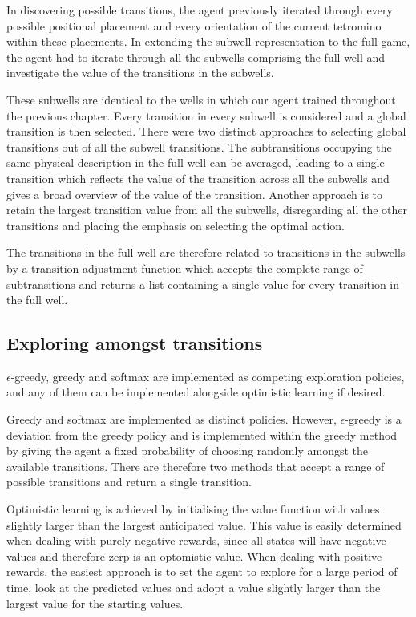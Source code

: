 \documentclass{rucsthesis}
\begin{document}
In discovering possible transitions, the agent previously iterated through every possible positional placement and every orientation of the current tetromino within these placements. In extending the subwell representation to the full game, the agent had to iterate through all the subwells comprising the full well and investigate the value of the transitions in the subwells.

These subwells are identical to the wells in which our agent trained throughout the previous chapter. Every transition in every subwell is considered and a global transition is then selected. There were two distinct approaches to selecting global transitions out of all the subwell transitions. The subtransitions occupying the same physical description in the full well can be averaged, leading to a single transition which reflects the value of the transition across all the subwells and gives a broad overview of the value of the transition. Another approach is to retain the largest transition value from all the subwells, disregarding all the other transitions and placing the emphasis on selecting the optimal action.

The transitions in the full well are therefore related to transitions in the subwells by a transition adjustment function which accepts the complete range of subtransitions and returns a list containing a single value for every transition in the full well.

\subsection{Exploring amongst transitions}

$\epsilon$-greedy, greedy and softmax are implemented as competing exploration policies, and any of them can be implemented alongside optimistic learning if desired.

Greedy and softmax are implemented as distinct policies. However, $\epsilon$-greedy is a deviation from the greedy policy and is implemented within the greedy method by giving the agent a fixed probability of choosing randomly amongst the available transitions. There are therefore two methods that accept a range of possible transitions and return a single transition.

Optimistic learning is achieved by initialising the value function with values slightly larger than the largest anticipated value. This value is easily determined when dealing with purely negative rewards, since all states will have negative values and therefore zerp is an optomistic value. When dealing with positive rewards, the easiest approach is to set the agent to explore for a large period of time, look at the predicted values and adopt a value slightly larger than the largest value for the starting values.
\end{document}
